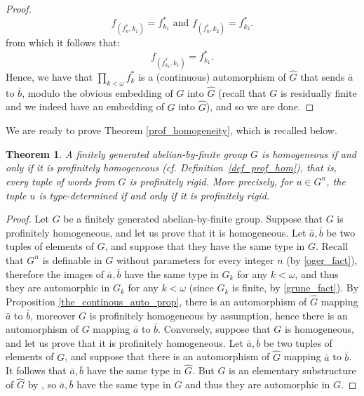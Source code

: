 \documentclass[a4paper, 11pt]{amsart}
\newtheorem{te}{Theorem}[section]
\theoremstyle{definition}
\theoremstyle{remark}
\begin{document}
\begin{proof}
$$f_{(f^*_{n}, k_1)} = f^{*}_{k_1} \text{ and } f_{(f^*_{n}, k_2)} = f^{*}_{k_2}.$$
from which it follows that:
$$f_{(f^*_{k_2}, k_1)} = f^{*}_{k_1}.$$
Hence, we have that $\prod_{k < \omega} f^*_k$ is a (continuous) automorphism of $\widehat{G}$ that sends $\bar{a}$ to $\bar{b}$, modulo the obvious embedding of $G$ into $\widehat{G}$ (recall that $G$ is residually finite and we indeed have an embedding of $G$ into $\widehat{G}$), and so we are done.
\end{proof}

We are ready to prove Theorem \ref{prof_homogeneity}, which is recalled below.

\begin{te} A finitely generated abelian-by-finite group $G$ is homogeneous if and only if it is profinitely homogeneous (cf. Definition~\ref{def_prof_hom}), that is, every tuple of words from $G$ is profinitely rigid. More precisely, for $u \in G^n$, the tuple $u$ is type-determined if and only if it is profinitely rigid.\end{te}	

\begin{proof}
Let $G$ be a finitely generated abelian-by-finite group. Suppose that $G$ is profinitely homogeneous, and let us prove that it is homogeneous. Let $\bar{a},\bar{b}$ be two tuples of elements of $G$, and suppose that they have the same type in $G$. Recall that $G^n$ is definable in $G$ without parameters for every integer $n$ (by \ref{oger_fact}), therefore the images of $\bar{a},\bar{b}$ have the same type in $G_k$ for any $k < \omega$, and thus they are automorphic in $G_k$ for any $k < \omega$ (since $G_k$ is finite, by \ref{grune_fact}). By Proposition \ref{the_continous_auto_prop}, there is an automorphism of $\widehat{G}$ mapping $\bar{a}$ to $\bar{b}$, moreover $G$ is profinitely homogeneous by assumption, hence there is an automorphism of $G$ mapping $\bar{a}$ to $\bar{b}$. Conversely, suppose that $G$ is homogeneous, and let us prove that it is profinitely homogeneous. Let $\bar{a},\bar{b}$ be two tuples of elements of $G$, and suppose that there is an automorphism of $\widehat{G}$ mapping $\bar{a}$ to $\bar{b}$. It follows that $\bar{a},\bar{b}$ have the same type in $\widehat{G}$. But $G$ is an elementary substructure of $\widehat{G}$ by \cite{Oger88}, so $\bar{a},\bar{b}$ have the same type in $G$ and thus they are automorphic in $G$.\end{proof}
\end{document}
